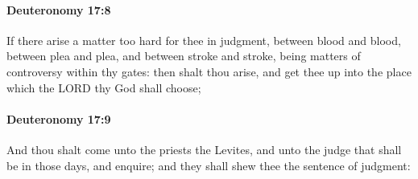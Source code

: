 		\paragraph{Deuteronomy 17:8} %
			\label{DEUTERONOMY-17-8}

			If there arise a matter too hard for thee in judgment, between blood and blood, between plea and plea, and between stroke and stroke, being matters of controversy within thy gates: then shalt thou arise, and get thee up into the place which the LORD thy God shall choose;


		\paragraph{Deuteronomy 17:9} %
			\label{DEUTERONOMY-17-9}

			And thou shalt come unto the priests the Levites, and unto the judge that shall be in those days, and enquire; and they shall shew thee the sentence of judgment:

